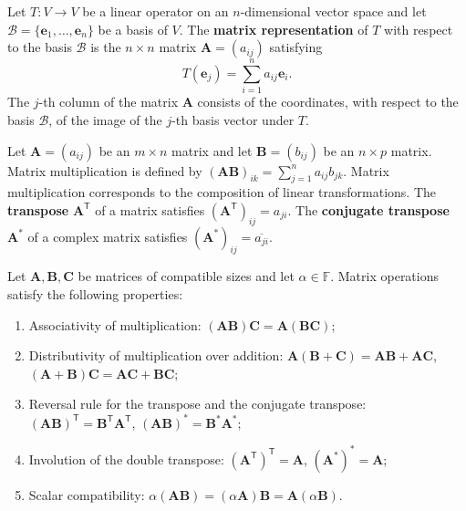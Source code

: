 \begin{definition}\label{def:matrix_representation}
Let $T: V \to V$ be a linear operator on an $n$-dimensional vector space and let $\mathcal{B} = \{\mathbf{e}_1, \dots, \mathbf{e}_n\}$ be a basis of $V$. The \textbf{matrix representation} of $T$ with respect to the basis $\mathcal{B}$ is the $n \times n$ matrix $\mathbf{A} = (a_{ij})$ satisfying
\[
T(\mathbf{e}_j) = \sum_{i=1}^n a_{ij} \mathbf{e}_i.
\]
The $j$-th column of the matrix $\mathbf{A}$ consists of the coordinates, with respect to the basis $\mathcal{B}$, of the image of the $j$-th basis vector under $T$.
\end{definition}

\begin{definition}\label{def:matrix_operations}
Let $\mathbf{A} = (a_{ij})$ be an $m \times n$ matrix and let $\mathbf{B} = (b_{ij})$ be an $n \times p$ matrix. Matrix multiplication is defined by $(\mathbf{A}\mathbf{B})_{ik} = \sum_{j=1}^n a_{ij} b_{jk}$. Matrix multiplication corresponds to the composition of linear transformations. The \textbf{transpose} $\mathbf{A}^{\mathsf T}$ of a matrix satisfies $(\mathbf{A}^{\mathsf T})_{ij} = a_{ji}$. The \textbf{conjugate transpose} $\mathbf{A}^*$ of a complex matrix satisfies $(\mathbf{A}^*)_{ij} = \overline{a_{ji}}$.
\end{definition}

\begin{property}\label{ch5_matrix_operation_properties}
Let $\mathbf{A}, \mathbf{B}, \mathbf{C}$ be matrices of compatible sizes and let $\alpha \in \mathbb{F}$. Matrix operations satisfy the following properties:
\begin{enumerate}[label=(\roman*)]
    \item Associativity of multiplication: $(\mathbf{A}\mathbf{B})\mathbf{C} = \mathbf{A}(\mathbf{B}\mathbf{C})$;
    \item Distributivity of multiplication over addition: $\mathbf{A}(\mathbf{B}+\mathbf{C}) = \mathbf{A}\mathbf{B} + \mathbf{A}\mathbf{C}$, $(\mathbf{A}+\mathbf{B})\mathbf{C} = \mathbf{A}\mathbf{C} + \mathbf{B}\mathbf{C}$;
    \item Reversal rule for the transpose and the conjugate transpose: $(\mathbf{A}\mathbf{B})^{\mathsf T} = \mathbf{B}^{\mathsf T}\mathbf{A}^{\mathsf T}$, $(\mathbf{A}\mathbf{B})^* = \mathbf{B}^*\mathbf{A}^*$;
    \item Involution of the double transpose: $(\mathbf{A}^{\mathsf T})^{\mathsf T} = \mathbf{A}$, $(\mathbf{A}^*)^* = \mathbf{A}$;
    \item Scalar compatibility: $\alpha(\mathbf{A}\mathbf{B}) = (\alpha\mathbf{A})\mathbf{B} = \mathbf{A}(\alpha\mathbf{B})$.
\end{enumerate}
\end{property}

